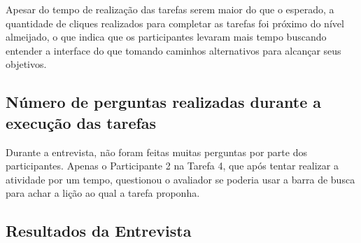 Apesar do tempo de realização das tarefas serem maior do que o esperado, a quantidade de cliques realizados para completar as tarefas foi próximo do nível almeijado, o que indica que os participantes levaram mais tempo buscando entender a interface do que tomando caminhos alternativos para alcançar seus objetivos.

\subsection{Número de perguntas realizadas durante a execução das tarefas}
Durante a entrevista, não foram feitas muitas perguntas por parte dos participantes. Apenas o Participante 2 na Tarefa 4, que após tentar realizar a atividade por um tempo, questionou o avaliador se poderia usar a barra de busca para achar a lição ao qual a tarefa proponha.

\subsection{Resultados da Entrevista}

